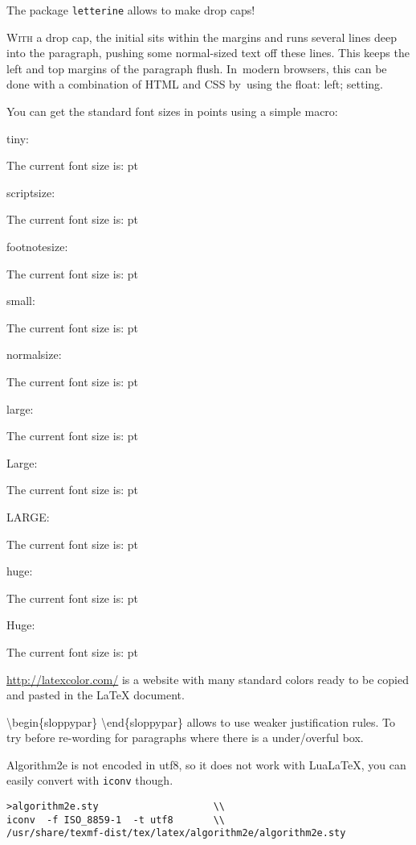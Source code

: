 \documentclass[a4paper]{article}
\makeatletter
\newcommand\thefontsize[1]{{#1 The current font size is: \f@size pt\par}}
\makeatother
\begin{document}
\vskip5mm
The package \texttt{letterine} allows to make drop caps!

\lettrine[lines=3,slope=-4pt,nindent=-4pt,findent=2pt]{W}{ith} a drop cap, the initial sits
within the margins and runs several lines deep into the paragraph, pushing some
normal-sized text off these lines. This keeps the left and top margins of the
paragraph flush.  In~modern browsers, this can be done with a combination of
HTML and CSS by~using the float: left; setting.

You can get the standard font sizes in points using a simple macro:

tiny: \thefontsize\tiny
scriptsize: \thefontsize\scriptsize
footnotesize: \thefontsize\footnotesize
small: \thefontsize\small
normalsize: \thefontsize\normalsize
large: \thefontsize\large
Large: \thefontsize\Large
LARGE: \thefontsize\LARGE
huge: \thefontsize\huge
Huge: \thefontsize\Huge


\url{http://latexcolor.com/} is a website with many standard colors ready to be copied
and pasted in the \LaTeX{} document.

\textbackslash{}begin\{sloppypar\} \textbackslash{}end\{sloppypar\} allows to
use weaker justification rules. To try before re-wording for paragraphs where
there is a under/overful box.

Algorithm2e is not encoded in utf8, so it does not work with LuaLaTeX,
you can easily convert with \texttt{iconv} though.
\begin{verbatim}
>algorithm2e.sty                    \\
iconv  -f ISO_8859-1  -t utf8       \\
/usr/share/texmf-dist/tex/latex/algorithm2e/algorithm2e.sty 
\end{verbatim}
\end{document}
